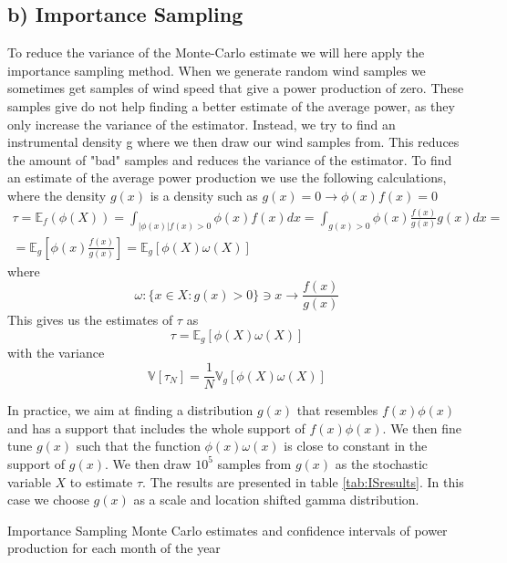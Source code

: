 \documentclass[a4paper]{article}
\begin{document}
\subsection*{b) Importance Sampling}
To reduce the variance of the Monte-Carlo estimate we will here apply the importance sampling method. When we generate random wind samples we sometimes get samples of wind speed that give a power production of zero. These samples give do not help finding a better estimate of the average power, as they only increase the variance of the estimator. Instead, we try to find an instrumental density g where we then draw our wind samples from. This reduces the amount of "bad" samples and reduces the variance of the estimator. \noindent To find an estimate of the average power production we use the following calculations, where the density $g(x)$ is a density such as $g(x) = 0 \rightarrow \phi(x)f(x) = 0$
\begin{equation}
    \begin{gathered}
        \tau = \mathbb{E}_f(\phi(X)) = \int_{|\phi(x)|f(x)>0}\phi(x)f(x)dx = \int_{g(x)>0}\phi(x)\frac{f(x)}{g(x)}g(x)dx = \\
        = \mathbb{E}_g[\phi(x)\frac{f(x)}{g(x)}] = \mathbb{E}_g[\phi(X)\omega(X)]
    \end{gathered}
\end{equation}
where
\begin{equation}
    \omega : \{x \in X : g(x)>0 \} \ni x \rightarrow \frac{f(x)}{g(x)}
\end{equation}
This gives us the estimates of $\tau$ as
\begin{equation}
    \tau = \mathbb{E}_g[\phi(X)\omega(X)]
\end{equation}
with the variance
\begin{equation}
    \mathbb{V}[\tau_N] = \frac{1}{N}\mathbb{V}_g[\phi(X)\omega(X)]
\end{equation}

In practice, we aim at finding a distribution $g(x)$ that resembles $f(x)\phi(x)$ and has a support that includes the whole support of $f(x)\phi(x)$. We then fine tune $g(x)$ such that the function $\phi(x)\omega(x)$ is close to constant in the support of $g(x)$. We then draw $10^5$ samples from $g(x)$ as the stochastic variable $X$ to estimate $\tau$. The results are presented in table \ref{tab:ISresults}. In this case we choose $g(x)$ as a scale and location shifted gamma distribution.

\begin{table}[H]
    \centering
    \caption{Importance Sampling Monte Carlo estimates and confidence intervals of power production for each month of the year}
    \label{tab:ISresults}
    
\end{table}
\end{document}
